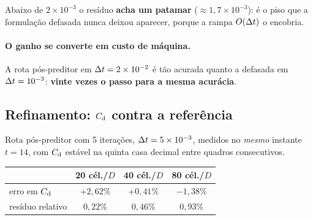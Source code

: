 \medskip
Abaixo de $2\times10^{-3}$ o resíduo \textbf{acha um patamar} ($\approx
1{,}7\times10^{-3}$): é o piso que a formulação defasada nunca deixou aparecer,
porque a rampa $O(\Delta t)$ o encobria.

\paragraph{O ganho se converte em custo de máquina.} A rota pós-preditor em
$\Delta t = 2\times10^{-2}$ é tão acurada quanto a defasada em $\Delta t = 10^{-3}$:
\textbf{vinte vezes o passo para a mesma acurácia}.

\subsection{Refinamento: \texorpdfstring{$C_{\mathrm{d}}$}{Cd} contra a referência}


\medskip
Rota pós-preditor com 5 iterações, $\Delta t = 5\times10^{-3}$, medidos no
\emph{mesmo} instante $t = 14$, com $C_{\mathrm{d}}$ estável na quinta casa decimal entre
quadros consecutivos.

\begin{center}
\begin{tabular}{lSSS}
  \toprule
  & {20 cél./$D$} & {40 cél./$D$} & {80 cél./$D$} \\
  \midrule
  erro em $C_{\mathrm{d}}$   & {$+2{,}62\%$} & {$+0{,}41\%$} & {$-1{,}38\%$} \\
  resíduo relativo & {$0{,}22\%$}  & {$0{,}46\%$}  & {$0{,}93\%$} \\
  \bottomrule
\end{tabular}
\end{center}

